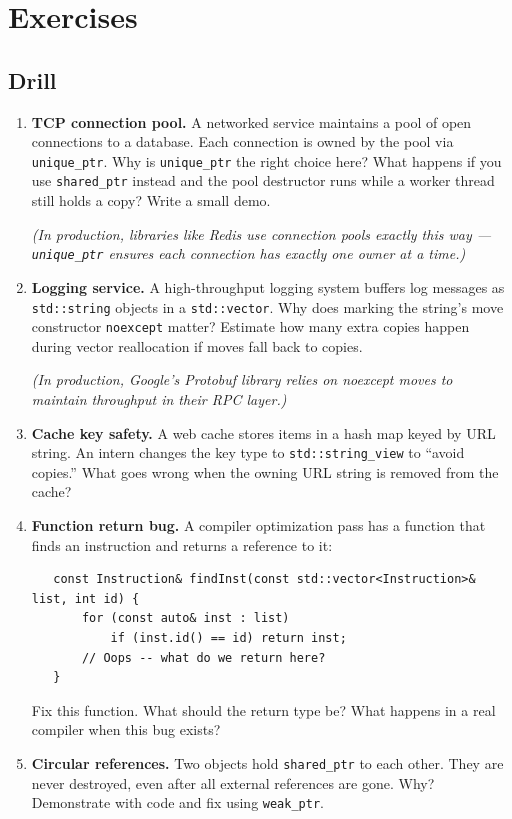 \section{Exercises}

\subsection{Drill}

\begin{enumerate}
\item \textbf{TCP connection pool.} A networked service maintains a pool of open connections to a database. Each connection is owned by the pool via \texttt{unique\_ptr}. Why is \texttt{unique\_ptr} the right choice here? What happens if you use \texttt{shared\_ptr} instead and the pool destructor runs while a worker thread still holds a copy? Write a small demo.

   \textit{(In production, libraries like Redis use connection pools exactly this way — \texttt{unique\_ptr} ensures each connection has exactly one owner at a time.)}

\item \textbf{Logging service.} A high-throughput logging system buffers log messages as \texttt{std::string} objects in a \texttt{std::vector}. Why does marking the string's move constructor \texttt{noexcept} matter? Estimate how many extra copies happen during vector reallocation if moves fall back to copies.

   \textit{(In production, Google's Protobuf library relies on noexcept moves to maintain throughput in their RPC layer.)}

\item \textbf{Cache key safety.} A web cache stores items in a hash map keyed by URL string. An intern changes the key type to \texttt{std::string\_view} to ``avoid copies.'' What goes wrong when the owning URL string is removed from the cache?

\item \textbf{Function return bug.} A compiler optimization pass has a function that finds an instruction and returns a reference to it:
\begin{lstlisting}
   const Instruction& findInst(const std::vector<Instruction>& list, int id) {
       for (const auto& inst : list)
           if (inst.id() == id) return inst;
       // Oops -- what do we return here?
   }
\end{lstlisting}
   Fix this function. What should the return type be? What happens in a real compiler when this bug exists?

\item \textbf{Circular references.} Two objects hold \texttt{shared\_ptr} to each other. They are never destroyed, even after all external references are gone. Why? Demonstrate with code and fix using \texttt{weak\_ptr}.
\end{enumerate}

